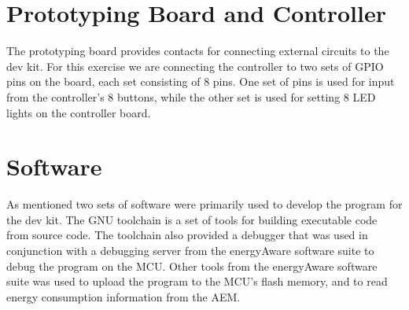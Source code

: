 \section{Prototyping Board and Controller}

The prototyping board provides contacts for connecting external circuits to the
dev kit. \cite{DK3750Manual} For this exercise we are connecting the controller
to two sets of GPIO pins on the board, each set consisting of 8 pins. One set of
pins is used for input from the controller's 8 buttons, while the other set is
used for setting 8 LED lights on the controller board.

\section{Software}

As mentioned two sets of software were primarily used to develop the program for
the dev kit. The GNU toolchain is a set of tools for building executable code
from source code. The toolchain also provided a debugger that was used in
conjunction with a debugging server from the energyAware software suite to debug
the program on the MCU. Other tools from the energyAware software suite was used
to upload the program to the MCU's flash memory, and to read energy consumption
information from the AEM. \cite{TDT4528Compendium}
